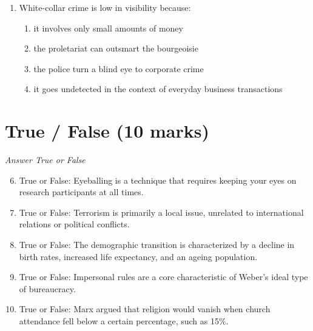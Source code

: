 \documentclass[12pt]{article}
\begin{document}
\begin{enumerate}[label=\arabic*.]
\begin{enumerate}[label=(\alph*)]
    \item testing out new research methods to see which one works best
    \item isolating and measuring the effect of one variable upon another
    \item using personal beliefs and values to decide what to study
    \item interpreting data subjectively, drawing on theoretical paradigms
\end{enumerate}
\item White-collar crime is low in visibility because:
\begin{enumerate}[label=(\alph*)]
    \item it involves only small amounts of money
    \item the proletariat can outsmart the bourgeoisie
    \item the police turn a blind eye to corporate crime
    \item it goes undetected in the context of everyday business transactions
\end{enumerate}
\end{enumerate}

\section*{True / False (10 marks)}
\textit{Answer True or False}
\begin{enumerate}[label=\arabic*.]
\setcounter{enumi}{5}
\item True or False: Eyeballing is a technique that requires keeping your eyes on research participants at all times.
\item True or False: Terrorism is primarily a local issue, unrelated to international relations or political conflicts.
\item True or False: The demographic transition is characterized by a decline in birth rates, increased life expectancy, and an ageing population.
\item True or False: Impersonal rules are a core characteristic of Weber's ideal type of bureaucracy.
\item True or False: Marx argued that religion would vanish when church attendance fell below a certain percentage, such as 15\%.
\end{enumerate}
\end{document}
